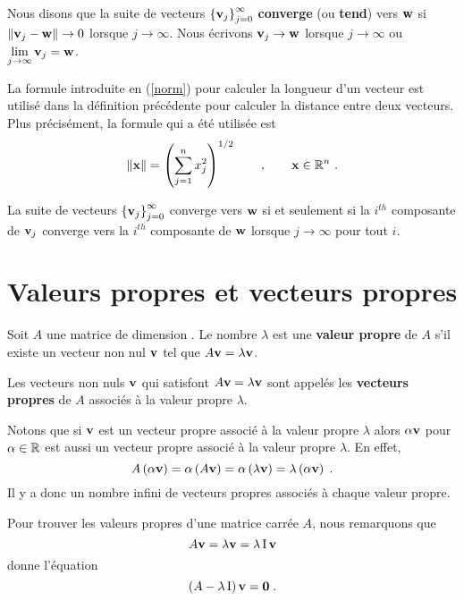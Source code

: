 {\begin{defn} 
Nous disons que la suite de vecteurs
$\displaystyle \left\{\mathbf{v}_j\right\}_{j=0}^\infty$
{\bfseries converge} (ou {\bfseries tend}) vers $\mathbf{w}$ si
$\| \mathbf{v}_j - \mathbf{w}\|\to 0$ lorsque $j \to \infty$.  Nous écrivons
$\mathbf{v}_j \rightarrow \mathbf{w}$ lorsque $j\rightarrow \infty$ ou
$\displaystyle \lim_{j\to \infty} \mathbf{v}_j = \mathbf{w}$.
\end{defn}

La formule introduite en (\ref{norm}) pour calculer la longueur d'un
vecteur est utilisé dans la définition précédente pour calculer la
distance entre deux vecteurs.   Plus précisément, la formule qui a été
utilisée est
\[
\| \mathbf{x} \| = \left( \sum_{j=1}^n x_j^2 \right)^{1/2} \qquad , \qquad
\mathbf{x} \in \mathbb{R}^n \ .
\]

\begin{prop}
La suite de vecteurs $\displaystyle \left\{\mathbf{v}_j\right\}_{j=0}^\infty$
converge vers $\mathbf{w}$ si et seulement si la $i^{th}$ composante de
$\mathbf{v}_j$ converge vers la $i^{th}$ composante de $\mathbf{w}$ lorsque
$j\rightarrow \infty$ pour tout $i$.
\end{prop}

\section{Valeurs propres et vecteurs propres}

\begin{defn} 
Soit $A$ une matrice de dimension \nn.  Le nombre $\lambda$ est une
{\bfseries valeur propre} de $A$ s'il existe un
vecteur non nul $\mathbf{v}$ tel que $A\mathbf{v} = \lambda \mathbf{v}$.

Les vecteurs non nuls $\mathbf{v}$ qui satisfont
$A\mathbf{v} = \lambda \mathbf{v}$ sont appelés les
{\bfseries vecteurs propres} de $A$ associés à
la valeur propre $\lambda$.
\end{defn}

Notons que si $\mathbf{v}$ est un vecteur propre associé à la valeur
propre $\lambda$ alors $\alpha \mathbf{v}$ pour $\alpha \in \mathbb{R}$ est
aussi un vecteur propre associé à la valeur propre $\lambda$.  En
effet,
\[
A\left(\alpha \mathbf{v}\right) = \alpha \left(A\mathbf{v}\right)
= \alpha \left( \lambda \mathbf{v} \right)
= \lambda \left(\alpha \mathbf{v}\right) \; .
\]
Il y a donc un nombre infini de vecteurs propres associés à chaque
valeur propre.

Pour trouver les valeurs propres d'une matrice carrée $A$, nous remarquons
que
\[
A\mathbf{v} = \lambda \mathbf{v} = \lambda \operatorname{I} \mathbf{v}
\]
donne l'équation
\begin{equation}\label{eigCond}
\left( A - \lambda \operatorname{I}\right) \mathbf{v} = \mathbf{0} \; .
\end{equation}

}
